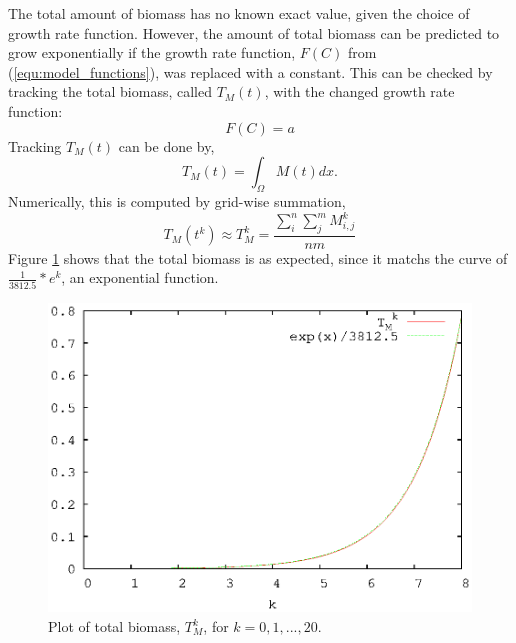   The total amount of biomass has no known exact value, given the choice of growth rate function.
  However, the amount of total biomass can be predicted to grow exponentially if the growth rate function, $F(C)$ from (\ref{equ:model_functions}), was replaced with a constant.
  This can be checked by tracking the total biomass, called $T_{M}(t)$, with the changed growth rate function:
  \begin{equation} \label{equ:F_constant}
    F(C) = a
  \end{equation}
  Tracking $T_{M}(t)$ can be done by,
  \begin{equation} \label{equ:total_biomass}
    T_{M}(t) = \int_{\Omega} M(t) dx.
  \end{equation}
  Numerically, this is computed by  grid-wise summation,
  \begin{equation}
    T_{M}(t^k) \approx T_{M}^{k} = \frac{ \sum^n_i \sum^m_j M^{k}_{i,j} }{nm}
  \end{equation}
  Figure \ref{fig:basic_growth} shows that the total biomass is as expected, since it matchs the curve of $\frac{1}{3812.5}*e^{k}$, an exponential function.

  \begin{figure}
    \centering
    \includegraphics[scale = 0.9]{basic_growth}
    \caption{Plot of total biomass, $T_{M}^{k}$, for $k = 0,1,...,20$.}
    \label{fig:basic_growth}
  \end{figure}
  
